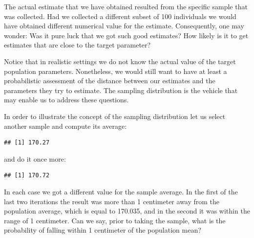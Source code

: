 \documentclass[]{krantz}
\makeatletter
\newenvironment{Shaded}{\begin{snugshade}}{\end{snugshade}}
\newcommand{\KeywordTok}[1]{\textcolor[rgb]{0.13,0.29,0.53}{\textbf{#1}}}
\newcommand{\DecValTok}[1]{\textcolor[rgb]{0.00,0.00,0.81}{#1}}
\newcommand{\StringTok}[1]{\textcolor[rgb]{0.31,0.60,0.02}{#1}}
\newcommand{\OperatorTok}[1]{\textcolor[rgb]{0.81,0.36,0.00}{\textbf{#1}}}
\newcommand{\NormalTok}[1]{#1}
\newenvironment{kframe}{%
\medskip{}
\setlength{\fboxsep}{.8em}
 \def\at@end@of@kframe{}%
 \ifinner\ifhmode%
  \def\at@end@of@kframe{\end{minipage}}%
  \begin{minipage}{\columnwidth}%
 \fi\fi%
 \def\FrameCommand##1{\hskip\@totalleftmargin \hskip-\fboxsep
 \colorbox{shadecolor}{##1}\hskip-\fboxsep
     \hskip-\linewidth \hskip-\@totalleftmargin \hskip\columnwidth}%
 \MakeFramed {\advance\hsize-\width
   \@totalleftmargin\z@ \linewidth\hsize
   \@setminipage}}%
 {\par\unskip\endMakeFramed%
 \at@end@of@kframe}
\renewenvironment{Shaded}{\begin{kframe}}{\end{kframe}}
\theoremstyle{definition}
\theoremstyle{definition}
\theoremstyle{definition}
\theoremstyle{remark}
\makeatother
\begin{document}
The actual estimate that we have obtained resulted from the specific
sample that was collected. Had we collected a different subset of 100
individuals we would have obtained different numerical value for the
estimate. Consequently, one may wonder: Was it pure luck that we got
such good estimates? How likely is it to get estimates that are close to
the target parameter?

Notice that in realistic settings we do not know the actual value of the
target population parameters. Nonetheless, we would still want to have
at least a probabilistic assessment of the distance between our
estimates and the parameters they try to estimate. The sampling
distribution is the vehicle that may enable us to address these
questions.

In order to illustrate the concept of the sampling distribution let us
select another sample and compute its average:

\begin{Shaded}
\end{Shaded}

\begin{verbatim}
## [1] 170.27
\end{verbatim}

and do it once more:

\begin{Shaded}
\end{Shaded}

\begin{verbatim}
## [1] 170.72
\end{verbatim}

In each case we got a different value for the sample average. In the
first of the last two iterations the result was more than 1 centimeter
away from the population average, which is equal to 170.035, and in the
second it was within the range of 1 centimeter. Can we say, prior to
taking the sample, what is the probability of falling within 1
centimeter of the population mean?
\end{document}
